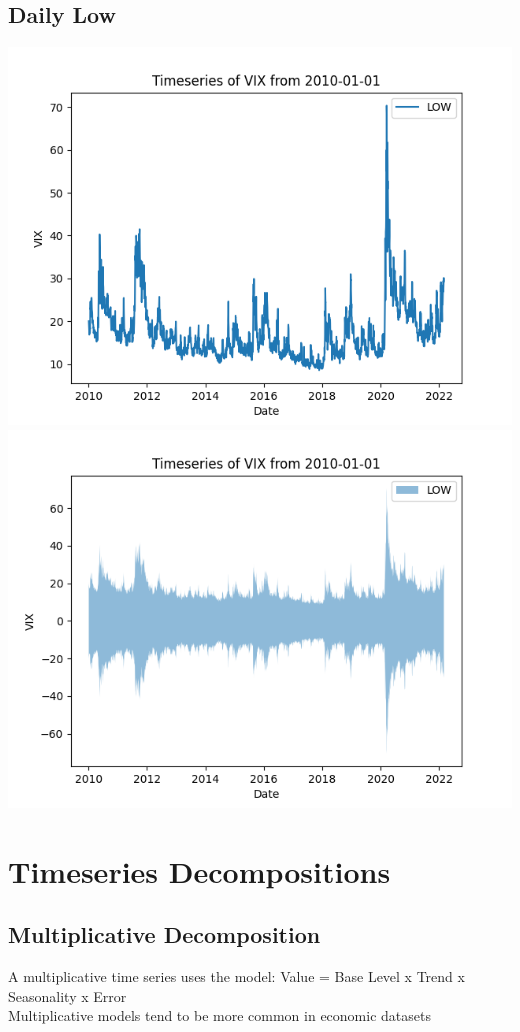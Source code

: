 \documentclass{article}
\begin{document}
\subsection{Daily Low}
\begin{center} 
    \includegraphics{VIX_Low_Timeseries_2010}
    \includegraphics{VIX_Low_Timeseries_Fill_2010}
\end{center}

\section{Timeseries Decompositions}

\subsection{Multiplicative Decomposition}
A multiplicative time series uses the model: Value = Base Level x Trend x Seasonality x Error \\
Multiplicative models tend to be more common in economic datasets
\end{document}

